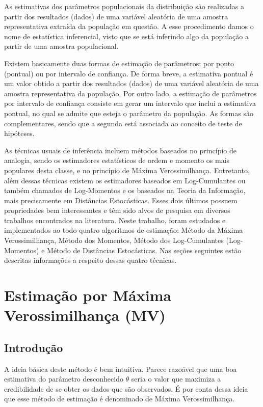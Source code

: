 As estimativas dos parâmetros populacionais da distribuição são realizadas a partir dos resultados (dados) de uma variável aleatória de uma amostra representativa extraída da população em questão. A esse procedimento damos o nome de estatística inferencial, visto que se está inferindo algo da população a partir de uma amostra populacional.

Existem basicamente duas formas de estimação de parâmetros: por ponto (pontual) ou por intervalo de confiança. De forma breve, a estimativa pontual é um valor obtido a partir dos resultados (dados) de uma variável aleatória de uma amostra representativa da população. 
Por outro lado, a estimação de parâmetros por intervalo de confiança consiste em gerar um intervalo que inclui a estimativa pontual, no qual se admite que esteja o parâmetro da população.
As formas são complementares, sendo que a segunda está associada ao conceito de teste de hipóteses. 

As técnicas usuais de inferência incluem métodos baseados no princípio de analogia, sendo os estimadores estatísticos de ordem e momento os mais populares desta classe, e no princípio de Máxima Verossimilhança. Entretanto, além dessas técnicas existem os estimadores baseados em Log-Cumulantes ou também chamados de Log-Momentos e os baseados na Teoria da Informação, mais precisamente em Distâncias Estocásticas. Esses dois últimos possuem propriedades bem interessantes e têm sido alvos de pesquisa em diversos trabalhos encontrados na literatura. Neste trabalho, foram estudados e implementados ao todo quatro algoritmos de estimação: Método da Máxima Verossimilhança, Método dos Momentos, Método dos Log-Cumulantes (Log-Momentos) e Método de Distâncias Estocásticas. Nas seções seguintes estão descritas informações a respeito dessas quatro técnicas.

\section{Estimação por Máxima Verossimilhança (MV)}

\subsection{Introdução}

A ideia básica deste método é bem intuitiva. Parece razoável que uma boa estimativa do parâmetro desconhecido \begin{math} \theta \end{math} seria o valor que maximiza a credibilidade de se obter os dados que são observados. 
É por conta dessa ideia que esse método de estimação é denominado de Máxima Verossimilhança. 
 
